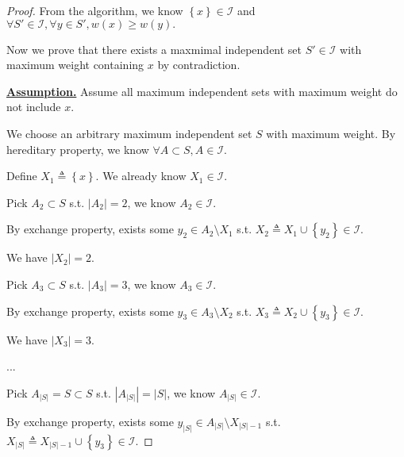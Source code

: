 \documentclass{article}
\newcommand{\set}[1]{\left\{#1\right\}}
\begin{document}
\begin{proof}
    From the algorithm, we know $\set{x}\in\mathcal{I}$ and $\forall S'\in\mathcal{I}, \forall y\in S', w(x)\geq w(y).$
    
    \hspace{1.3em}
    Now we prove that there exists a maxmimal independent set $S'\in\mathcal{I}$ with maximum weight containing $x$ by contradiction.
    
    \vspace{2em} \hspace{1.3em}
    \underline{\textbf{Assumption.}} Assume all maximum independent sets with maximum weight do not include $x$. 
    
    \hspace{1.3em}
    We choose an arbitrary maximum independent set $S$ with maximum weight. By hereditary property, we know $\forall A\subset S, A\in\mathcal{I}$.
    
    \vspace{1em} \hspace{1.3em}
    Define $X_1\triangleq\set{x}.$ We already know $X_1\in\mathcal{I}$.
    
    \hspace{1.3em}
    Pick $A_2\subset S$ s.t. $|A_2|=2$, we know $A_2\in\mathcal{I}$. 
    
    \hspace{3.9em}
    By exchange property, exists some $y_2\in A_2\setminus X_1$ s.t. $X_2\triangleq X_1\cup\set{y_2}\in\mathcal{I}$. 
    
    \hspace{3.9em}
    We have $|X_2|=2.$
    
    \hspace{1.3em}
    Pick $A_3\subset S$ s.t. $|A_3|=3$, we know $A_3\in\mathcal{I}$. 
    
    \hspace{3.9em}
    By exchange property, exists some $y_3\in A_3\setminus X_2$ s.t. $X_3\triangleq X_2\cup\set{y_3}\in\mathcal{I}$.
    
    \hspace{3.9em}
    We have $|X_3|=3.$
    
    \hspace{1.3em}
    ...
    
    \hspace{1.3em}
    Pick $A_{|S|}=S\subset S$ s.t. $|A_{|S|}|=|S|$, we know $A_{|S|}\in\mathcal{I}$. 
    
    \hspace{3.9em}
    By exchange property, exists some $y_{|S|}\in A_{|S|}\setminus X_{|S|-1}$ s.t. $X_{|S|}\triangleq X_{|S|-1}\cup\set{y_3}\in\mathcal{I}$. 
    

\end{proof}
\end{document}
